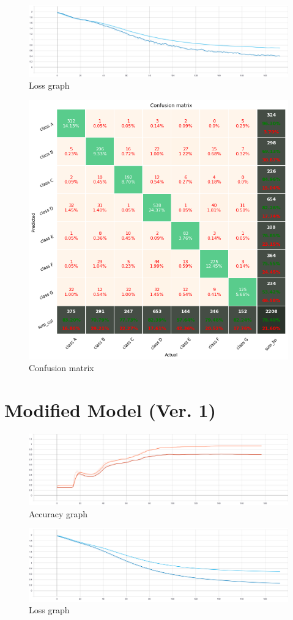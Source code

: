 \begin{figure}[htbp]
\centering
\includegraphics[width=0.7\linewidth]{results/fig/Loss0.png}
\caption{Loss graph}
\label{fig:evaluation0}
\end{figure}

\begin{figure}[htbp]
\centering
\includegraphics[width=0.6\linewidth]{results/fig/confusion0.png}
\caption{Confusion matrix}
\label{fig:confusion0}
\end{figure}

\newpage
\section{Modified Model (Ver. 1)}

\begin{figure}[htbp]
\centering
\includegraphics[width=0.7\linewidth]{results/fig/Accuracy1.png}
\caption{Accuracy graph}
\label{fig:accuracy1}
\end{figure}

\begin{figure}[htbp]
\centering
\includegraphics[width=0.7\linewidth]{results/fig/Loss1.png}
\caption{Loss graph}
\label{fig:evaluation1}
\end{figure}


